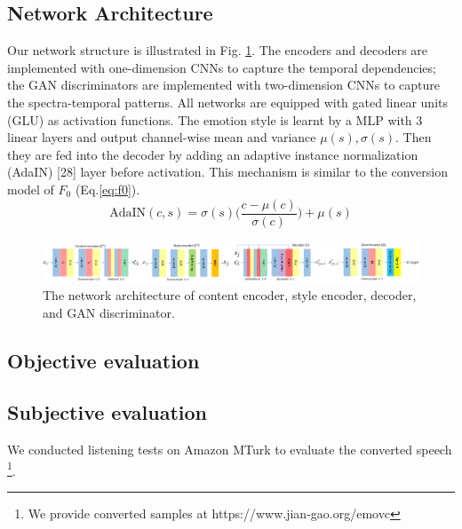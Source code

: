 \documentclass{article}
\begin{document}
\subsection{Network Architecture}
Our network structure is illustrated in Fig. \ref{fig:NN}. The encoders and decoders are implemented with one-dimension CNNs to capture the temporal dependencies; the GAN discriminators are implemented with two-dimension CNNs to capture the spectra-temporal patterns. All networks are equipped with gated linear units (GLU) as activation functions. The emotion style is learnt by a MLP with 3 linear layers and output channel-wise mean and variance $\mu(s), \sigma(s)$. Then they are fed into the decoder by adding an adaptive instance normalization (AdaIN) [28] layer before activation. This mechanism is similar to the conversion model of $F_0$ (Eq.\ref{eq:f0}).
\begin{equation}
\text{AdaIN}(c,s) = \sigma(s)\Big(\frac{c-\mu(c)}{\sigma(c)}\Big) + \mu(s)
\end{equation}

\begin{figure}[t!]
\includegraphics[width=1.0\textwidth]{FIG/NN}
\caption{The network architecture of content encoder, style encoder, decoder, and GAN discriminator.}
\label{fig:NN}
\end{figure}



\subsection{Objective evaluation}


\subsection{Subjective evaluation}
We conducted listening tests on Amazon MTurk to evaluate the converted speech \footnote{We provide converted samples at https://www.jian-gao.org/emovc}.
\end{document}
